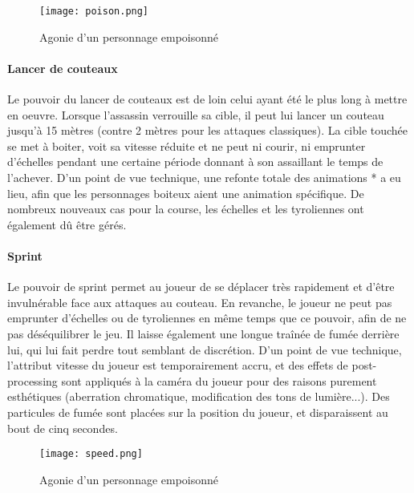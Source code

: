 			\begin{figure}[hbt!]
				\centering
				\texttt{[image: poison.png]}
				\caption{Agonie d'un personnage empoisonné}
			\end{figure}
			\FloatBarrier

		
		\paragraph{Lancer de couteaux}

			Le pouvoir du lancer de couteaux est de loin celui ayant été le plus long à mettre en oeuvre. Lorsque l'assassin 
			verrouille sa cible, il peut lui lancer un couteau jusqu'à 15 mètres (contre 2 mètres pour les attaques classiques).
			La cible touchée se met à boiter, voit sa vitesse réduite et ne peut ni courir, ni emprunter d'échelles pendant une certaine 
			période donnant à son assaillant le temps de l'achever. D'un point de vue technique, une refonte totale des animations *
			a eu lieu, afin que les personnages boiteux aient une animation spécifique. De nombreux nouveaux cas pour la course, les 
			échelles et les tyroliennes ont également dû être gérés. 


		\paragraph{Sprint}
	
			Le pouvoir de sprint permet au joueur de se déplacer très rapidement et d'être invulnérable face aux attaques 
			au couteau. En revanche, le joueur ne peut pas emprunter d'échelles ou de tyroliennes en même temps que ce pouvoir, afin 
			de ne pas déséquilibrer le jeu. Il laisse également une longue traînée de fumée derrière lui, qui lui fait perdre 
			tout semblant de discrétion. D'un point de vue technique, l'attribut vitesse du joueur est temporairement accru, 
			et des effets de post-processing sont appliqués à la caméra du joueur pour des raisons purement esthétiques (aberration 
			chromatique, modification des tons de lumière...). Des particules de fumée sont placées sur la position du joueur, et 
			disparaissent au bout de cinq secondes.

			\begin{figure}[hbt!]
				\centering
				\texttt{[image: speed.png]}
				\caption{Agonie d'un personnage empoisonné}
			\end{figure}
			\FloatBarrier
		
		


